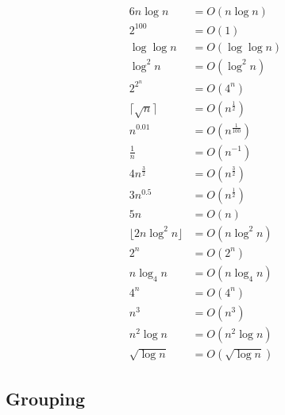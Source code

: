 \documentclass{article}
\begin{document}
\begin{align}
    6n\log n &= O(n\log n) \\
    2^{100} &= O(1) \\
    \log \log n &= O(\log \log n) \\
    \log^2 n &= O(\log^2 n) \\
    2^{2^{n}} &= O(4^{n}) \\
    \lceil \sqrt{n} \rceil &= O(n^{\frac{1}{2}}) \\
    n^{0.01} &= O(n^{\frac{1}{100}}) \\
    \frac{1}{n} &= O(n^{-1}) \\
    4n^{\frac{3}{2}} &= O(n^{\frac{3}{2}}) \\
    3n^{0.5} &= O(n^{\frac{1}{2}}) \\
    5n &= O(n)\\
    \lfloor 2n \log^2n \rfloor &= O(n \log^2n) \\
    2^n &= O(2^n) \\
    n \log_4 n &= O(n \log_4 n) \\
    4^n &= O(4^n) \\
    n^3 &= O(n^3) \\
    n^2 \log n &= O(n^2 \log n) \\
    \sqrt{\log n} &= O(\sqrt{\log n})
\end{align}

\subsection{Grouping}
\end{document}
